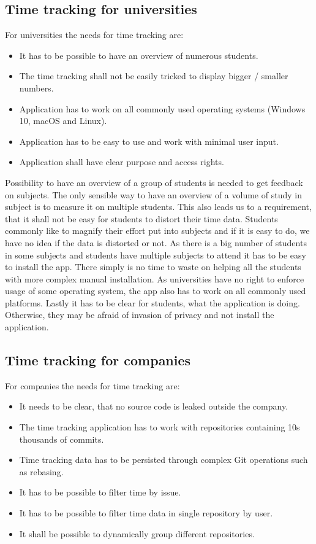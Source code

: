 \subsection{Time tracking for universities}\label{subsec:time-tracking-for-universities}
For universities the needs for time tracking are:
\begin{itemize}
    \item It has to be possible to have an overview of numerous students.
    \item The time tracking shall not be easily tricked to display bigger / smaller numbers.
    \item Application has to work on all commonly used operating systems (Windows 10, macOS and Linux).
    \item Application has to be easy to use and work with minimal user input.
    \item Application shall have clear purpose and access rights.
\end{itemize}

Possibility to have an overview of a group of students is needed to get feedback on subjects.
The only sensible way to have an overview of a volume of study in subject is to measure it on multiple students.
This also leads us to a requirement, that it shall not be easy for students to distort their time data.
Students commonly like to magnify their effort put into subjects and if it is easy to do, we have no idea if the data is distorted or not.
As there is a big number of students in some subjects and students have multiple subjects to attend it has to be easy to install the app.
There simply is no time to waste on helping all the students with more complex manual installation.
As universities have no right to enforce usage of some operating system, the app also has to work on all commonly used platforms.
Lastly it has to be clear for students, what the application is doing.
Otherwise, they may be afraid of invasion of privacy and not install the application.

\subsection{Time tracking for companies}\label{subsec:time-tracking-for-companies}
For companies the needs for time tracking are:
\begin{itemize}
    \item It needs to be clear, that no source code is leaked outside the company.
    \item The time tracking application has to work with repositories containing 10s thousands of commits.
    \item Time tracking data has to be persisted through complex Git operations such as rebasing.
    \item It has to be possible to filter time by issue.
    \item It has to be possible to filter time data in single repository by user.
    \item It shall be possible to dynamically group different repositories.
\end{itemize}

